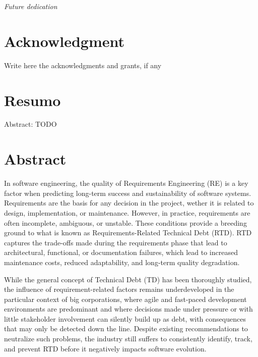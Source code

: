 \documentclass[12pt,reqno, twoside]{amsbook}
\theoremstyle{plain}
\numberwithin{equation}{chapter}
\newenvironment{dedication}
  {%
   \thispagestyle{empty}%
   \vspace*{\stretch{1}}%
   \itshape             %
   \raggedleft          %
  }
  {\par %
   \vspace{\stretch{3}} %
  }
\numberwithin{section}{chapter}
\begin{document}

\clearpage
\thispagestyle{empty}
\null
\frontmatter
{}


\begin{dedication}%

\begin{flushright}
\textit{Future dedication}
\end{flushright}%
\end{dedication}

\setcounter{page}{1}
\chapter*{Acknowledgment}

Write here the acknowledgments and grants, if any

\chapter*{Resumo}

Abstract: TODO

\chapter*{Abstract}
In software engineering, the quality of Requirements Engineering (RE) is a key factor when predicting long-term success and sustainability of software systems. Requirements are the basis for any decision in the project, wether it is related to design, implementation, or maintenance. However, in practice, requirements are often incomplete, ambiguous, or unstable. These conditions provide a breeding ground to what is known as Requirements-Related Technical Debt (RTD). RTD captures the trade-offs made during the requirements phase that lead to architectural, functional, or documentation failures, which lead to increased maintenance costs, reduced adaptability, and long-term quality degradation.

While the general concept of Technical Debt (TD) has been thoroughly studied, the influence of requirement-related factors remains underdeveloped in the particular context of big corporations, where agile and fast-paced development environments are predominant and where decisions made under pressure or with little stakeholder involvement can silently build up as debt, with consequences that may only be detected down the line. Despite existing recommendations to neutralize such problems, the industry still suffers to consistently identify, track, and prevent RTD before it negatively impacts software evolution.
\end{document}
